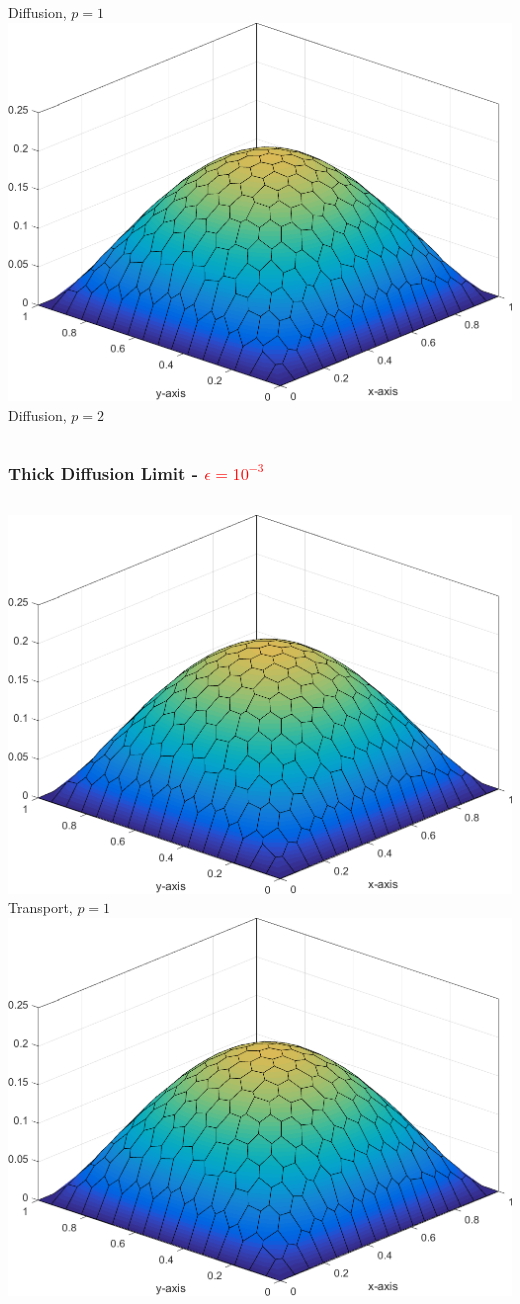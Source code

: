 \documentclass[compress,10pt]{beamer}
\newcommand{\tcr}[1]{\textcolor{red}{#1}}
\begin{document}
\begin{frame}[t]
{\begin{columns}
Diffusion, $p=1$
{}\includegraphics[width=0.75\columnwidth]{images/Sq_poly_MAXENT_k=2.png}\\
Diffusion, $p=2$
\end{columns}
}
{
\frametitle{Thick Diffusion Limit - \tcr{$\epsilon = 10^{-3}$}}
\begin{columns}
\centering
{}\includegraphics[width=0.75\columnwidth]{images/Sq_poly_MAXENT_k=1_ep=1e-3.png}\\
Transport, $p=1$
{}\includegraphics[width=0.75\columnwidth]{images/Sq_poly_MAXENT_k=2_ep=1e-3.png}\\

\end{columns}}
\end{frame}
\end{document}
